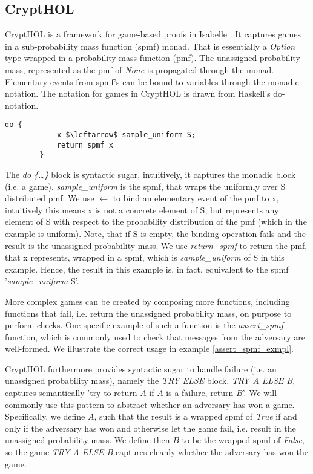 \subsection*{CryptHOL}
CryptHOL is a framework for game-based proofs in Isabelle \parencite{CryptHOL_game_based}. It captures games in a sub-probability mass function (spmf) monad. That is essentially a \textit{Option} type wrapped in a probability mass function (pmf). The unassigned probability mass, represented as the pmf of \textit{None} is propagated through the monad.
Elementary events from spmf's can be bound to variables through the monadic notation. 
The notation for games in CryptHOL is drawn from Haskell's do-notation.  
\begin{example}
    \hspace{0mm}
    \begin{lstlisting}[language=isabelle]
        do {
            x $\leftarrow$ sample_uniform S;
            return_spmf x
        }
    \end{lstlisting}

    The \textit{do \{\dots\}} block is syntactic sugar, intuitively, it captures the monadic block (i.e. a game).
    \textit{sample\_uniform} is the spmf, that wraps the uniformly over S distributed pmf.
    We use $\leftarrow$ to bind an elementary event of the pmf to x, intuitively this means x is not a concrete element of S, but represents any element of S with respect to the probability distribution of the pmf (which in the example is uniform). Note, that if S is empty, the binding operation fails and the result is the unassigned probability mass. 
    We use \textit{return\_spmf} to return the pmf, that x represents, wrapped in a spmf, which is \textit{sample\_uniform} of S in this example. Hence, the result in this example is, in fact, equivalent to the spmf '\textit{sample\_uniform} S'.
\end{example}

More complex games can be created by composing more functions, including functions that fail, i.e. return the unassigned probability mass, on purpose to perform checks. One specific example of such a function is the \textit{assert\_spmf} function, which is commonly used to check that messages from the adversary are well-formed. We illustrate the correct usage in example \ref{assert_spmf_exmpl}. 

CryptHOL furthermore provides syntactic sugar to handle failure (i.e. an unassigned probability mass), namely the \textit{TRY ELSE} block. \textit{TRY A ELSE B}, captures semantically 'try to return $A$ if $A$ is a failure, return $B$'. We will commonly use this pattern to abstract whether an adversary has won a game. Specifically, we define $A$, such that the result is a wrapped spmf of \textit{True} if and only if the adversary has won and otherwise let the game fail, i.e. result in the unassigned probability mass. We define then $B$ to be the wrapped spmf of \textit{False}, so the game \textit{TRY A ELSE B} captures cleanly whether the adversary has won the game.

